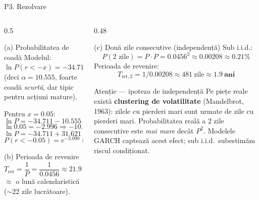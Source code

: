 \documentclass[9pt, aspectratio=169, t]{beamer}
\begin{document}
\begin{frame}[shrink=22]{P3. Rezolvare}
\begin{columns}[T]
\begin{column}{0.5\textwidth}
\begin{block}{(a) Probabilitatea de coadă}
Modelul: $\ln P(r<-x)= -34.711 -10.555\ln x$ (deci $\alpha=10.555$, foarte coadă \emph{scurtă}, dar tipic pentru acțiuni mature).

Pentru $x=0.05$:
\[
\ln P = -34.711 -10.555\cdot \ln 0.05
\]
\[
\ln 0.05 = -2.996\Rightarrow -10.555\cdot(-2.996)= 31.621
\]
\[
\ln P = -34.711 + 31.621 = -3.090
\]
\[
\boxed{P(r<-0.05) = e^{-3.090} \approx 0.0456 \approx \mathbf{4.56\%}}
\]
\end{block}
\begin{block}{(b) Perioada de revenire}
\[
T_{\text{ret}} = \frac{1}{P} = \frac{1}{0.0456} \approx \mathbf{21.9\ \text{zile de tranzacționare}}
\]
$\approx$ o lună calendaristică ($\sim$22 zile lucrătoare).
\end{block}
\end{column}
\begin{column}{0.48\textwidth}
\begin{block}{(c) Două zile consecutive (independență)}
Sub i.i.d.:
\[
P(\text{2 zile}) = P\cdot P = 0.0456^2 \approx 0.00208 \approx \mathbf{0.21\%}
\]
Perioada de revenire:
\[
T_{\text{ret},2} = 1/0.00208 \approx 481\ \text{zile} \approx \mathbf{1.9\ \text{ani}}
\]
\end{block}
\begin{alertblock}{Atenție --- ipoteza de independență}
Pe piețe reale există \textbf{clustering de volatilitate} (Mandelbrot, 1963): zilele cu pierderi mari sunt urmate de zile cu pierderi mari. Probabilitatea reală a 2 zile consecutive este \emph{mai mare} decât $P^2$. Modelele GARCH captează acest efect; sub i.i.d.\ subestimăm riscul condiționat.
\end{alertblock}
\end{column}
\end{columns}
\end{frame}
\end{document}
